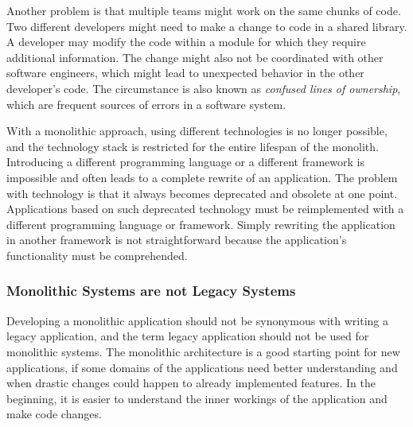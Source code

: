 \bigskip

\noindent Another problem is that multiple teams might work on the same chunks of code. Two different developers might need to make a change to code in a shared library. A developer may modify the code within a module for which they require additional information. The change might also not be coordinated with other software engineers, which might lead to unexpected behavior in the other developer's code. The circumstance is also known as \textit{confused lines of ownership}, which are frequent sources of errors in a software system. \cite[15]{book:2019:newman:background:monolith:monolith-to-microservices} \cite[7]{inproceedings:2011:bird:background:monoliths:dont-touch-my-code}

\bigskip

\noindent With a monolithic approach, using different technologies is no longer possible, and the technology stack is restricted for the entire lifespan of the monolith. Introducing a different programming language or a different framework is impossible and often leads to a complete rewrite of an application. \cite[6-7]{book:2018:richardson:background:bff:microservices-patterns} The problem with technology is that it always becomes deprecated and obsolete at one point. Applications based on such deprecated technology must be reimplemented with a different programming language or framework. Simply rewriting the application in another framework is not straightforward because the application's functionality must be comprehended.

\subsubsection{Monolithic Systems are not Legacy Systems}\label{subsection:background:software-monolith:not-legacy-systems}

Developing a monolithic application should not be synonymous with writing a legacy application, and the term legacy application should not be used for monolithic systems. \cite[15]{book:2019:newman:background:monolith:monolith-to-microservices} The monolithic architecture is a good starting point for new applications, if some domains of the applications need better understanding and when drastic changes could happen to already implemented features. In the beginning, it is easier to understand the inner workings of the application and make code changes. \cite[43]{book:2019:newman:background:monolith:monolith-to-microservices}
